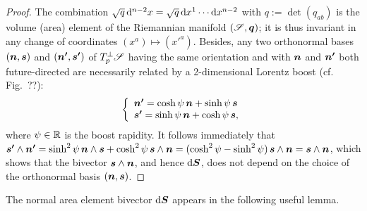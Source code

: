 \begin{proof}
The combination $\sqrt{q}\, \mathrm{d}^{n-2} x = \sqrt{q}\, \mathrm{d} x^1 \cdots \mathrm{d} x^{n-2}$ with
$q := \det(q_{ab})$ is the volume (area)
element of the Riemannian manifold $(\mathscr{S},\bm{q})$; it is thus invariant in any change of coordinates
$(x^a) \mapsto ({x'}^a)$. Besides, any two orthonormal bases $(\bm{n},\bm{s})$
and $(\bm{n'},\bm{s'})$ of $T_p^\perp\mathscr{S}$ having the same orientation
and with $\bm{n}$ and $\bm{n'}$ both future-directed are necessarily related by a
2-dimensional Lorentz boost (cf. Fig.~??):
\[
   \left\{\begin{array}{l}
    \bm{n'} = \cosh\psi \, \bm{n} + \sinh\psi \, \bm{s} \\
    \bm{s'} = \sinh\psi \, \bm{n} + \cosh\psi \, \bm{s} ,
    \end{array}\right.
\]
where $\psi\in\mathbb{R}$ is the boost rapidity. It follows immediately
that $\bm{s'}\wedge\bm{n'} = \sinh^2\psi \, \bm{n}\wedge\bm{s} + \cosh^2\psi \, \bm{s}\wedge\bm{n}
= ( \cosh^2\psi - \sinh^2\psi )\,  \bm{s}\wedge\bm{n} = \bm{s}\wedge\bm{n}$, which
shows that the bivector $\bm{s}\wedge\bm{n}$, and hence $\mathrm{d} \bm{S}$, does not depend on the
choice of the orthonormal basis $(\bm{n},\bm{s})$.
\end{proof}

The normal area element bivector $\mathrm{d}\bm{S}$ appears in the following useful lemma.

